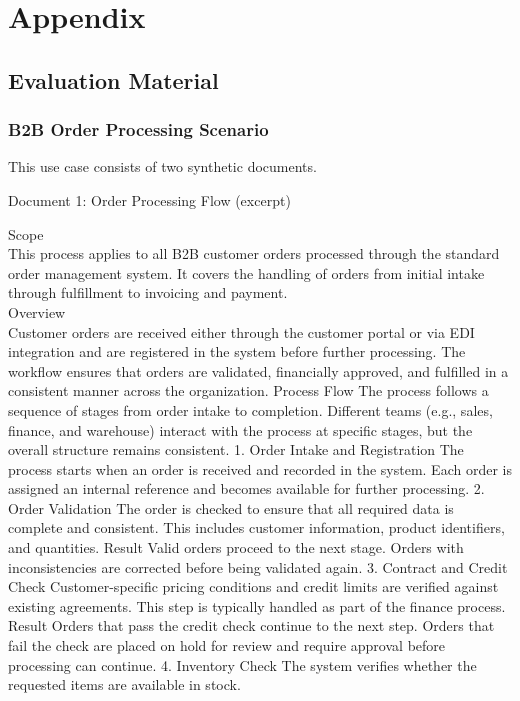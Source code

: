 \chapter{Appendix}


\section{Evaluation Material}
\subsection{B2B Order Processing Scenario}
\label{app:order}

This use case consists of two synthetic documents.

Document 1: Order Processing Flow (excerpt)

Scope\\
This process applies to all B2B customer orders processed through the standard order management system.
It covers the handling of orders from initial intake through fulfillment to invoicing and payment.\\
Overview\\
Customer orders are received either through the customer portal or via EDI integration and are registered in the system before further processing.
The workflow ensures that orders are validated, financially approved, and fulfilled in a consistent manner across the organization.
Process Flow
The process follows a sequence of stages from order intake to completion.
Different teams (e.g., sales, finance, and warehouse) interact with the process at specific stages, but the overall structure remains consistent.
1. Order Intake and Registration
The process starts when an order is received and recorded in the system.
Each order is assigned an internal reference and becomes available for further processing.
2. Order Validation
The order is checked to ensure that all required data is complete and consistent.
This includes customer information, product identifiers, and quantities.
Result
Valid orders proceed to the next stage.
Orders with inconsistencies are corrected before being validated again.
3. Contract and Credit Check
Customer-specific pricing conditions and credit limits are verified against existing agreements.
This step is typically handled as part of the finance process.
Result
Orders that pass the credit check continue to the next step.
Orders that fail the check are placed on hold for review and require approval before processing can continue.
4. Inventory Check
The system verifies whether the requested items are available in stock.
